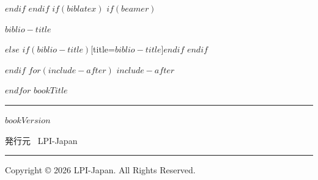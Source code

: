\documentclass[
$if(fontsize)$
  $fontsize$,
$endif$
$if(papersize)$
  $papersize$paper,
$endif$
$if(beamer)$
  ignorenonframetext,
$if(handout)$
  handout,
$endif$
$if(aspectratio)$
  aspectratio=$aspectratio$,
$endif$
$endif$
$for(classoption)$
  $classoption$$sep$,
$endfor$
]{$documentclass$}
\newif\ifbibliography
\begin{document}
$endif$
$endif$
$if(biblatex)$
$if(beamer)$
\begin{frame}[allowframebreaks]{$biblio-title$}
  \bibliographytrue
  \printbibliography[heading=none]
\end{frame}
$else$
\printbibliography$if(biblio-title)$[title=$biblio-title$]$endif$
$endif$

$endif$
$for(include-after)$
$include-after$

$endfor$
\newpage
\thispagestyle{empty}
  \vspace*{\fill}
  {\LARGE $bookTitle$}

  \rule{\textwidth}{0.5pt}

  $bookVersion$

  発行元 \, LPI-Japan

  \rule{\textwidth}{0.5pt}

  Copyright \copyright{} 2026 LPI-Japan. All Rights Reserved.

  \vspace*{1cm}
\end{document}
